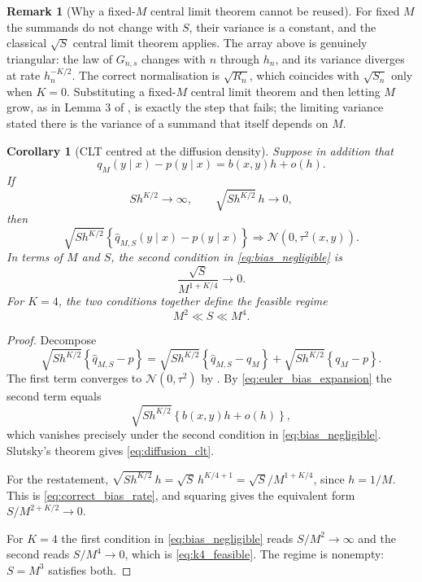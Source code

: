 \documentclass[11pt]{article}
\newtheorem{corollary}[corollary]{Corollary}
\theoremstyle{definition}
\newtheorem{remark}[remark]{Remark}
\newcommand{\Normal}{\mathcal{N}}
\begin{document}
\begin{remark}[Why a fixed-$M$ central limit theorem cannot be reused]\label{rem:not_uniform}
For fixed $M$ the summands do not change with $S$, their variance is a constant, and the classical $\sqrt S$ central limit theorem applies. The array above is genuinely triangular: the law of $G_{n,s}$ changes with $n$ through $h_n$, and its variance diverges at rate $h_n^{-K/2}$. The correct normalisation is $\sqrt{R_n}$, which coincides with $\sqrt{S_n}$ only when $K=0$. Substituting a fixed-$M$ central limit theorem and then letting $M$ grow, as in Lemma 3 of \citet{BrandtSantaClara2002}, is exactly the step that fails; the limiting variance stated there is the variance of a summand that itself depends on $M$.
\end{remark}

\begin{corollary}[CLT centred at the diffusion density]\label{cor:diffusion_clt}
Suppose in addition that
\begin{equation}\label{eq:euler_bias_expansion}
q_M(y\mid x)-p(y\mid x)=b(x,y)h+o(h).
\end{equation}
If
\begin{equation}\label{eq:bias_negligible}
S h^{K/2}\to\infty,
\qquad
\sqrt{S h^{K/2}}\,h\to0,
\end{equation}
then
\begin{equation}\label{eq:diffusion_clt}
\sqrt{S h^{K/2}}
\left\{\widehat q_{M,S}(y\mid x)-p(y\mid x)\right\}
\Longrightarrow
\Normal(0,\tau^2(x,y)).
\end{equation}
In terms of $M$ and $S$, the second condition in \eqref{eq:bias_negligible} is
\begin{equation}\label{eq:correct_bias_rate}
\frac{\sqrt S}{M^{1+K/4}}\longrightarrow0.
\end{equation}
For $K=4$, the two conditions together define the feasible regime
\begin{equation}\label{eq:k4_feasible}
M^2\ll S\ll M^4.
\end{equation}
\end{corollary}

\begin{proof}
Decompose
\[
\sqrt{Sh^{K/2}}\left\{\widehat q_{M,S}-p\right\}
=\sqrt{Sh^{K/2}}\left\{\widehat q_{M,S}-q_M\right\}
+\sqrt{Sh^{K/2}}\left\{q_M-p\right\}.
\]
The first term converges to $\Normal(0,\tau^2)$ by . By \eqref{eq:euler_bias_expansion} the second term equals
\[
\sqrt{Sh^{K/2}}\left\{b(x,y)h+o(h)\right\},
\]
which vanishes precisely under the second condition in \eqref{eq:bias_negligible}. Slutsky's theorem gives \eqref{eq:diffusion_clt}.

For the restatement, $\sqrt{Sh^{K/2}}\,h=\sqrt S\,h^{K/4+1}=\sqrt S/M^{1+K/4}$, since $h=1/M$. This is \eqref{eq:correct_bias_rate}, and squaring gives the equivalent form $S/M^{2+K/2}\to0$.

For $K=4$ the first condition in \eqref{eq:bias_negligible} reads $S/M^2\to\infty$ and the second reads $S/M^{4}\to0$, which is \eqref{eq:k4_feasible}. The regime is nonempty: $S=M^3$ satisfies both.
\end{proof}
\end{document}
